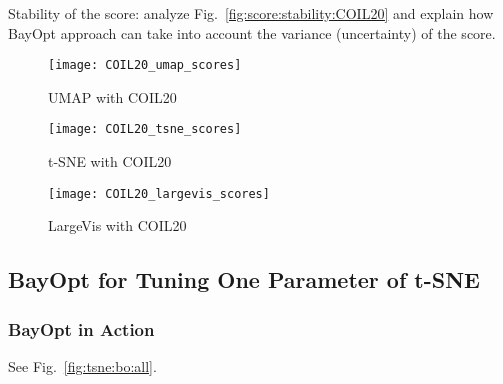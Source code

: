 Stability of the score: analyze Fig.~\ref{fig:score:stability:COIL20} and explain how BayOpt approach can take into account the variance (uncertainty) of the score.

\begin{figure*}[pos=h]
     \centering
     \begin{subfigure}[b]{0.32\textwidth}
         \centering
         \texttt{[image: COIL20\_umap\_scores]}
         \caption{UMAP with COIL20}
     \end{subfigure}
     \hfill
     \begin{subfigure}[b]{0.32\textwidth}
         \centering
         \texttt{[image: COIL20\_tsne\_scores]}
         \caption{t-SNE with COIL20}
     \end{subfigure}
     \hfill
     \begin{subfigure}[b]{0.32\textwidth}
         \centering
         \texttt{[image: COIL20\_largevis\_scores]}
         \caption{LargeVis with COIL20}
     \end{subfigure}
     \caption{Stability of the constraint preserving scores with three methods UMAP, t-SNE and LargeVis for COIL20 dataset.}
     \label{fig:score:stability:COIL20}
\end{figure*}

\subsection{BayOpt for Tuning One Parameter of t-SNE}

\subsubsection*{BayOpt in Action}
See Fig.~\ref{fig:tsne:bo:all}.

